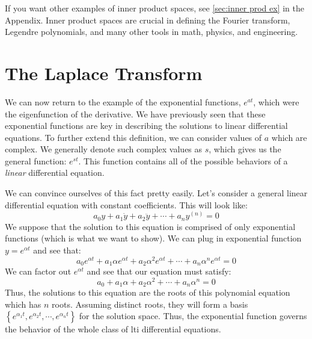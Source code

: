 If you want other examples of inner product spaces, see \autoref{sec:inner prod ex} in the Appendix. Inner product spaces are crucial in defining the Fourier transform, Legendre polynomials, and many other tools in math, physics, and engineering.

\section{The Laplace Transform}
We can now return to the example of the exponential functions, $e^{at}$, which were the eigenfunction of the derivative. We have previously seen that these exponential functions are key in describing the solutions to linear differential equations. To further extend this definition, we can consider values of $a$ which are complex. We generally denote such complex values as $s$, which gives us the general function: $e^{st}$. This function contains all of the possible behaviors of a \textit{linear} differential equation. 

We can convince ourselves of this fact pretty easily. Let's consider a general linear differential equation with constant coefficients. This will look like:
$$a_0y+a_1\dot{y}+a_2\ddot{y}+\cdots+a_ny^{(n)}=0$$
We suppose that the solution to this equation is comprised of only exponential functions (which is what we want to show). We can plug in exponential function $y=e^{\alpha t}$ and see that:
$$a_0e^{\alpha t}+a_1\alpha e^{\alpha t}+a_2\alpha^2 e^{\alpha t}+\cdots+a_n\alpha^n e^{\alpha t}=0$$
We can factor out $e^{\alpha t}$ and see that our equation must satisfy:
$$a_0+a_1\alpha +a_2\alpha^2+\cdots+a_n\alpha^n =0$$
Thus, the solutions to this equation are the roots of this polynomial equation which has $n$ roots. Assuming distinct roots, they will form a basis $\left\{e^{\alpha_1t},e^{\alpha_2t},\cdots,e^{\alpha_nt}\right\}$ for the solution space. Thus, the exponential function governs the behavior of the whole class of \gls{lti} differential equations. 

